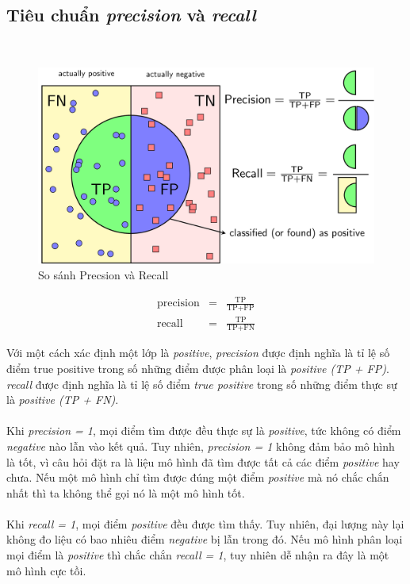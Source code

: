 \documentclass[a4paper, 12pt, oneside]{report}
\begin{document}
\subsection{Tiêu chuẩn \textit{precision} và \textit{recall}}\\
\begin{center}
    \begin{figure}[H]
    \begin{center}
     \includegraphics[scale=0.1]{hru/PR.png}
    \end{center}
    \caption{So sánh Precsion và Recall}
    \label{refhinh1}
    \end{figure}
\end{center}
\begin{mybox}
\begin{eqnarray}
\text{precision} &=& \frac{\text{TP}}{\text{TP} + \text{FP}} \\
\text{recall} &=& \frac{\text{TP}}{\text{TP} + \text{FN}}
\end{eqnarray}
\end{mybox}
Với một cách xác định một lớp là \textit{positive}, \textit{precision} được định nghĩa là tỉ lệ số điểm true positive trong số những điểm được phân loại là \textit{positive (TP + FP)}. \textit{recall} được định nghĩa là tỉ lệ số điểm \textit{true positive} trong số những điểm thực sự là \textit{positive (TP + FN)}.\\ \\
Khi \textit{precision = 1}, mọi điểm tìm được đều thực sự là \textit{positive}, tức không có điểm \textit{negative} nào lẫn vào kết quả. Tuy nhiên, \textit{precision = 1} không đảm bảo mô hình là tốt, vì câu hỏi đặt ra là liệu mô hình đã tìm được tất cả các điểm \textit{positive} hay chưa. Nếu một mô hình chỉ tìm được đúng một điểm \textit{positive} mà nó chắc chắn nhất thì ta không thể gọi nó là một mô hình tốt.\\ \\
Khi \textit{recall = 1}, mọi điểm \textit{positive} đều được tìm thấy. Tuy nhiên, đại lượng này lại không đo liệu có bao nhiêu điểm \textit{negative} bị lẫn trong đó. Nếu mô hình phân loại mọi điểm là \textit{positive} thì chắc chắn \textit{recall = 1}, tuy nhiên dễ nhận ra đây là một mô hình cực tồi.\\
\end{document}
